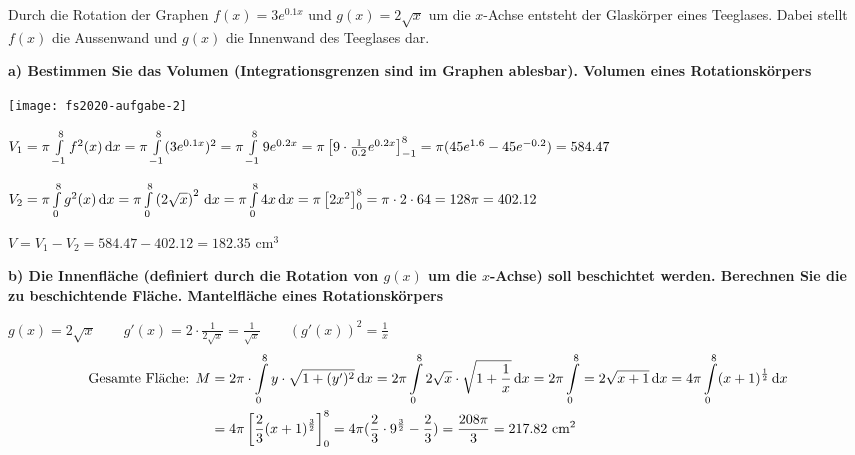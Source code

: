 
\begin{multicols}{2}
    Durch die Rotation der Graphen $f(x) = 3e^{0.1x}$ und $g(x) = 2 \sqrt{x}$ um die $x$-Achse entsteht der Glaskörper eines Teeglases.
    Dabei stellt $f(x)$ die Aussenwand und $g(x)$ die Innenwand des Teeglases dar.

    \textbf{a) Bestimmen Sie das Volumen (Integrationsgrenzen sind im Graphen ablesbar).
    Volumen eines Rotationskörpers}

    \columnbreak

    \begin{center}
        \texttt{[image: fs2020-aufgabe-2]}
    \end{center}
\end{multicols}

$V_1 = \pi \int \limits_{-1}^{8} f^2(x) \,\mathrm{d}x = \pi \int \limits_{-1}^{8} (3e^{0.1x})^2 = \pi \int \limits_{-1}^{8} 9 e^{0.2x} = \pi \left[ 9 \cdot \frac{1}{0.2} e^{0.2x} \right]_{-1}^{8} = \pi (45 e^{1.6} - 45 e^{-0.2}) = 584.47$

$V_2 = \pi \int \limits_{0}^{8} g^2(x) \,\mathrm{d}x = \pi \int \limits_{0}^{8} \left(2 \sqrt {x}\right)^2 \,\mathrm{d}x = \pi \int \limits_{0}^{8} 4x \,\mathrm{d}x = \pi \left[ 2x^2 \right]_0^8 = \pi \cdot 2 \cdot 64 = 128 \pi = 402.12$

$V = V_1 - V_2 = 584.47 - 402.12 = 182.35 \text{ cm}^3$

\textbf{b) Die Innenfläche (definiert durch die Rotation von $g(x)$ um die $x$-Achse) soll beschichtet werden.
Berechnen Sie die zu beschichtende Fläche.
Mantelfläche eines Rotationskörpers}

$g(x) = 2 \sqrt {x} \quad\quad g'(x) = 2 \cdot \frac{1}{2 \sqrt {x}} = \frac{1}{\sqrt {x}} \quad\quad (g'(x))^2 = \frac{1}{x}$
\begin{align*}
    \text{Gesamte Fläche: } M &= 2 \pi \cdot \int \limits_{0}^{8} y \cdot \sqrt {1 + (y')^2} \,\mathrm{d}x = 2 \pi \int \limits_{0}^{8} 2 \sqrt {x} \cdot \sqrt {1 + \frac{1}{x}} \,\mathrm{d}x = 2 \pi \int \limits_0^8 = 2 \sqrt {x + 1} \,\mathrm{d}x = 4 \pi \int \limits_0^8 (x + 1)^\frac{1}{2} \,\mathrm{d}x \\
    &= 4 \pi \left[ \frac{2}{3} (x + 1)^\frac{3}{2} \right]_0^8 = 4 \pi (\frac{2}{3} \cdot 9^\frac{3}{2} - \frac{2}{3}) = \frac{208\pi}{3} = 217.82 \text{ cm}^2
\end{align*}


